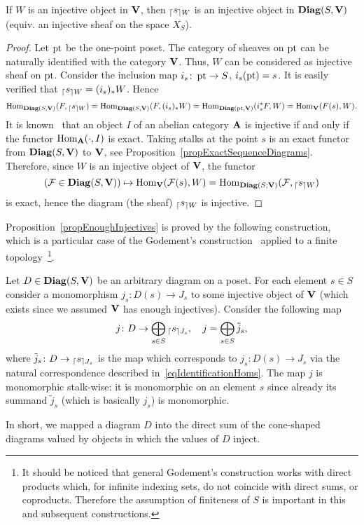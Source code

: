 \begin{lem}\label{lemElementaryInjective}
If $W$ is an injective object in $\mathbf{V}$, then ${_{\lceil}s_{\rceil W}}$ is an injective object in $\mathbf{Diag}(S,\mathbf{V})$ (equiv. an injective sheaf on the space $X_S$).
\end{lem}

\begin{proof}
Let $\operatorname{pt}$ be the one-point poset. The category of sheaves on $\operatorname{pt}$ can be naturally identified with the category $\mathbf{V}$. Thus, $W$ can be considered as injective sheaf on $\operatorname{pt}$. Consider the inclusion map $i_s\colon \operatorname{pt}\to S$, $i_s(\operatorname{pt})=s$. It is easily verified that ${_{\lceil}s_{\rceil W}}=(i_s)_*W$. Hence
\begin{equation}\label{eqIdentificationHoms}
\operatorname{Hom}_{\mathbf{Diag}(S,\mathbf{V})}(F,{_{\lceil}s_{\rceil W}})= \operatorname{Hom}_{\mathbf{Diag}(S,\mathbf{V})}(F,(i_s)_*W)=\operatorname{Hom}_{\mathbf{Diag}(\operatorname{pt},\mathbf{V})}(i_s^*F,W)=\operatorname{Hom}_{\mathbf{V}}(F(s),W).
\end{equation}
It is known~\cite[Lm.2.3.4]{weibel1994homalg} that an object $I$ of an abelian category $\mathbf{A}$ is injective if and only if the functor $\operatorname{Hom}_{\mathbf{A}}(\cdot, I)$ is exact. Taking stalks at the point $s$ is an exact functor from $\mathbf{Diag}(S,\mathbf{V})$ to $\mathbf{V}$, see Proposition~\ref{propExactSequenceDiagrams}. Therefore, since $W$ is an injective object of $\mathbf{V}$, the functor
\[
(\mathcal{F}\in\mathbf{Diag}(S,\mathbf{V}))\mapsto \operatorname{Hom}_{\mathbf{V}}(\mathcal{F}(s),W)=\operatorname{Hom}_{\mathbf{Diag}(S;\mathbf{V})}(\mathcal{F},{_{\lceil}s_{\rceil W}})
\]
is exact, hence the diagram (the sheaf) ${_{\lceil}s_{\rceil W}}$ is injective.
\end{proof}

Proposition~\ref{propEnoughInjectives} is proved by the following construction, which is a particular case of the Godement's construction~\cite{Godement1973} applied to a finite topology~\footnote{It should be noticed that general Godement's construction works with direct products which, for infinite indexing sets, do not coincide with direct sums, or coproducts. Therefore the assumption of finiteness of $S$ is important in this and subsequent constructions.}.

\begin{con}\label{conGodementConstruction}
Let $D\in\mathbf{Diag}(S,\mathbf{V})$ be an arbitrary diagram on a poset. For each element $s\in S$ consider a monomorphism $j_s\colon D(s)\to J_s$ to some injective object of $\mathbf{V}$ (which exists since we assumed $\mathbf{V}$ has enough injectives). Consider the following map
\begin{equation}\label{eqGodementPoset}
j\colon D\to \bigoplus_{s\in S}{_{\lceil}s_{\rceil J_s}}, \quad j=\bigoplus_{s\in S}\tilde{j}_s,
\end{equation}
where $\tilde{j}_s\colon D\to{_{\lceil}s_{\rceil J_s}}$ is the map which corresponds to $j_s\colon D(s)\to J_s$ via the natural correspondence described in~\eqref{eqIdentificationHoms}. The map $j$ is monomorphic stalk-wise: it is monomorphic on an element $s$ since already its summand $\tilde{j}_s$ (which is basically $j_s$) is monomorphic.

In short, we mapped a diagram $D$ into the direct sum of the cone-shaped diagrams valued by objects in which the values of $D$ inject.
\end{con}

